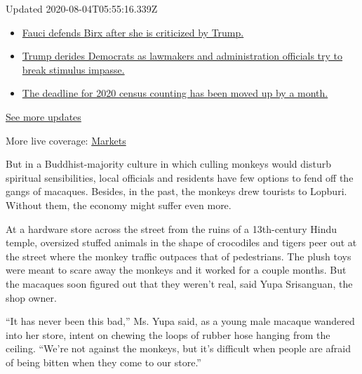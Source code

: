 Updated 2020-08-04T05:55:16.339Z

\begin{itemize}
\tightlist
\item
  \href{https://www.nytimes.com/2020/08/03/world/coronavirus-covid-19.html?action=click\&pgtype=Article\&state=default\&region=MAIN_CONTENT_1\&context=storylines_live_updates\#link-4547638f}{Fauci
  defends Birx after she is criticized by Trump.}
\item
  \href{https://www.nytimes.com/2020/08/03/world/coronavirus-covid-19.html?action=click\&pgtype=Article\&state=default\&region=MAIN_CONTENT_1\&context=storylines_live_updates\#link-15e7f995}{Trump
  derides Democrats as lawmakers and administration officials try to
  break stimulus impasse.}
\item
  \href{https://www.nytimes.com/2020/08/03/world/coronavirus-covid-19.html?action=click\&pgtype=Article\&state=default\&region=MAIN_CONTENT_1\&context=storylines_live_updates\#link-e5a2cda}{The
  deadline for 2020 census counting has been moved up by a month.}
\end{itemize}

\href{https://www.nytimes.com/2020/08/03/world/coronavirus-covid-19.html?action=click\&pgtype=Article\&state=default\&region=MAIN_CONTENT_1\&context=storylines_live_updates}{See
more updates}

More live coverage:
\href{https://www.nytimes.com/live/2020/08/03/business/stock-market-today-coronavirus?action=click\&pgtype=Article\&state=default\&region=MAIN_CONTENT_1\&context=storylines_live_updates}{Markets}

But in a Buddhist-majority culture in which culling monkeys would
disturb spiritual sensibilities, local officials and residents have few
options to fend off the gangs of macaques. Besides, in the past, the
monkeys drew tourists to Lopburi. Without them, the economy might suffer
even more.

At a hardware store across the street from the ruins of a 13th-century
Hindu temple, oversized stuffed animals in the shape of crocodiles and
tigers peer out at the street where the monkey traffic outpaces that of
pedestrians. The plush toys were meant to scare away the monkeys and it
worked for a couple months. But the macaques soon figured out that they
weren't real, said Yupa Srisanguan, the shop owner.

``It has never been this bad,'' Ms. Yupa said, as a young male macaque
wandered into her store, intent on chewing the loops of rubber hose
hanging from the ceiling. ``We're not against the monkeys, but it's
difficult when people are afraid of being bitten when they come to our
store.''

